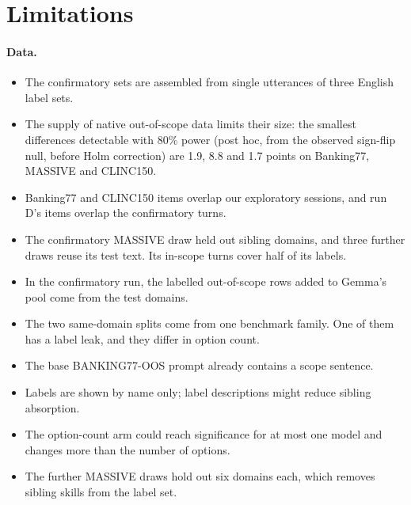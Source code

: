 \documentclass[11pt]{article}
\begin{document}
\section*{Limitations}

\paragraph{Data.}
\begin{itemize}
  \item The confirmatory sets are assembled from single utterances of three English label sets.
  \item The supply of native out-of-scope data limits their size: the smallest differences detectable with 80\% power (post hoc, from the observed sign-flip null, before Holm correction) are 1.9, 8.8 and 1.7 points on Banking77, MASSIVE and CLINC150.
  \item Banking77 and CLINC150 items overlap our exploratory sessions, and run D's items overlap the confirmatory turns.
  \item The confirmatory MASSIVE draw held out sibling domains, and three further draws reuse its test text. Its in-scope turns cover half of its labels.
  \item In the confirmatory run, the labelled out-of-scope rows added to Gemma's pool come from the test domains.
  \item The two same-domain splits come from one benchmark family. One of them has a label leak, and they differ in option count.
  \item The base BANKING77-OOS prompt already contains a scope sentence.
  \item Labels are shown by name only; label descriptions might reduce sibling absorption.
  \item The option-count arm could reach significance for at most one model and changes more than the number of options.
  \item The further MASSIVE draws hold out six domains each, which removes sibling skills from the label set.
\end{itemize}
\end{document}
